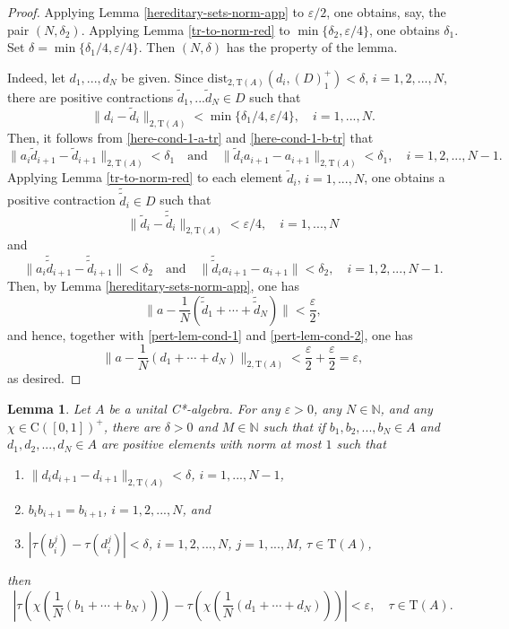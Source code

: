 \documentclass[12pt, oneside, psamsfonts]{amsart}
\newtheorem{lem}[thm]{Lemma}
\theoremstyle{definition}
\theoremstyle{remark}
\numberwithin{equation}{section}
\newcommand{\norm}[1]{\| #1\|}
\newcommand{\abs}[1]{| #1 |}
\newcommand{\eps}{\varepsilon}
\newcommand{\tr}{\mathrm{T}}
\begin{document}
\begin{proof}
Applying Lemma \ref{hereditary-sets-norm-app} to $\eps/2$, one obtains, say, the pair $(N, \delta_2)$. Applying Lemma \ref{tr-to-norm-red} to $\min\{\delta_2, \eps/4\}$, one obtains $\delta_1$. Set $\delta = \min\{\delta_1/4, \eps/4\}$. Then $(N, \delta)$ has the property of the lemma.

Indeed, let $d_1, ..., d_N$ be given. Since $\mathrm{dist}_{2, \tr(A)}(d_i, (D)^+_1) < \delta$, $i=1, 2, ..., N$, there are positive contractions $\tilde{d}_1, ... \tilde{d}_N \in D$ such that
\begin{equation}\label{pert-lem-cond-1}
\norm{d_i - \tilde{d}_i}_{2, \tr(A)} < \min\{\delta_1/4, \eps/4\},\quad i=1, ..., N.
\end{equation}
Then, it follows from \eqref{here-cond-1-a-tr} and \eqref{here-cond-1-b-tr} that
$$  \norm{a_{i} \tilde{d}_{i+1} - \tilde{d}_{i+1}}_{2, \tr(A)} < \delta_1 \quad \mathrm{and} \quad \norm{\tilde{d}_i a_{i+1} - a_{i+1}}_{2, \tr(A)} < \delta_1,\quad i=1, 2, ..., N-1. $$ 
Applying Lemma \ref{tr-to-norm-red} to each element $\tilde{d}_i$, $i=1, ..., N$, one obtains a positive contraction $\tilde{\tilde{d}}_i \in D$ such that
\begin{equation}\label{pert-lem-cond-2}  
 \norm{\tilde{d}_i - \tilde{\tilde{d}}_i}_{2, \tr(A)} < \eps/4,\quad i=1, ..., N 
 \end{equation}
and
$$  \norm{a_{i} \tilde{\tilde{d}}_{i+1} - \tilde{\tilde{d}}_{i+1}} < \delta_2 \quad \mathrm{and} \quad \norm{\tilde{\tilde{d}}_i a_{i+1} - a_{i+1}} < \delta_2,\quad i=1, 2, ..., N-1. $$ 
Then, by Lemma \ref{hereditary-sets-norm-app}, one has
$$\norm{ a  - \frac{1}{N}(\tilde{\tilde{d}}_1 + \cdots + \tilde{\tilde{d}}_N)} <  \frac{\eps}{2},$$
and hence, together with \eqref{pert-lem-cond-1} and \eqref{pert-lem-cond-2}, one has
$$\norm{ a  - \frac{1}{N}(d_1 + \cdots + d_N)}_{2, \tr(A)} < \frac{\eps}{2} + \frac{\eps}{2} = \eps,$$
as desired.
\end{proof}

\begin{lem}\label{hereditary-sets-preserve-tr}
Let $A$ be a unital C*-algebra. For any $\eps>0$, any $N \in \mathbb N$, and any $\chi\in \mathrm{C}([0, 1])^+$, there are $\delta>0$ and $M \in \mathbb N$ such that if $b_1, b_2, ..., b_N \in A$ and $d_1, d_2, ..., d_N \in A$ are positive elements with norm at most $1$ such that
\begin{enumerate}
\item $ \norm{d_id_{i+1} - d_{i+1}}_{2, \tr(A)} < \delta$, $i=1, ..., N-1$,  
\item $b_i b_{i+1} = b_{i+1}$, $i=1, 2, ..., N$, and
\item $\abs{\tau(b_i^j) - \tau(d_i^j)} < \delta$, $i=1, 2, ..., N$, $j=1, ..., M$, $\tau \in \tr(A)$,
\end{enumerate}
then
$$\abs{\tau(\chi(\frac{1}{N}(b_1 + \cdots + b_N))) - \tau(\chi(\frac{1}{N}(d_1 + \cdots + d_N))) } < \eps,\quad \tau \in \tr(A).$$
\end{lem}
\end{document}
